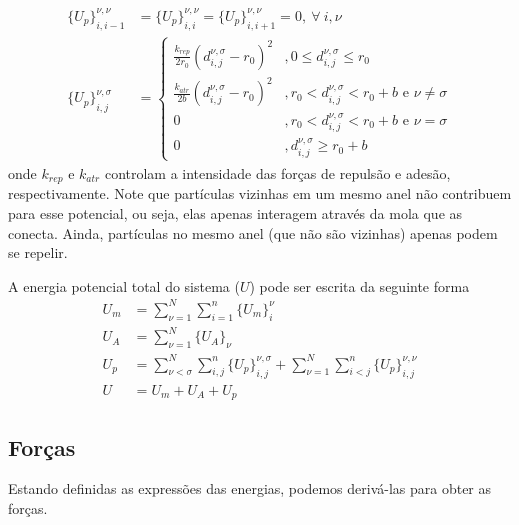 \documentclass{article}
\theoremstyle{definition}
\def \quantitygsc#1#2#3#4#5{{#1}_{#2, #3}^{#4, #5}}
\def \deslocgsc#1#2#3#4{\quantitygsc{d}{#1}{#2}{#3}{#4}}
\begin{document}
\begin{equation}
\begin{aligned}
{\{U_p\}}_{i, i-1}^{\nu, \nu} &= {\{U_p\}}_{i, i}^{\nu, \nu} = {\{U_p\}}_{i, i+1}^{\nu, \nu} = 0, ~\forall~i, \nu \\
{\{U_p\}}_{i, j}^{\nu, \sigma} &= \begin{cases}
    \frac{k_{rep}}{2r_0}(\deslocgsc{i}{j}{\nu}{\sigma} - r_0)^2 &, 0 \leq \deslocgsc{i}{j}{\nu}{\sigma} \leq r_0 \\
    \frac{k_{atr}}{2b}(\deslocgsc{i}{j}{\nu}{\sigma} - r_0)^2 &, r_0 < \deslocgsc{i}{j}{\nu}{\sigma} < r_0 + b \text{ e } \nu \neq \sigma \\
    0 &, r_0 < \deslocgsc{i}{j}{\nu}{\sigma} < r_0 + b \text{ e } \nu = \sigma \\
    0 &, \deslocgsc{i}{j}{\nu}{\sigma} \geq r_0 + b 
\end{cases}
\end{aligned}
\label{eq:particle_particle_pot}
\end{equation}
onde $k_{rep}$ e $k_{atr}$ controlam a intensidade das forças de repulsão e adesão, respectivamente. Note que partículas vizinhas em um mesmo anel não contribuem para esse potencial, ou seja, elas apenas interagem através da mola que as conecta. Ainda, partículas no mesmo anel (que não são vizinhas) apenas podem se repelir. 

A energia potencial total do sistema ($U$) pode ser escrita da seguinte forma
\begin{equation}
\begin{aligned}
    U_m &= \sum_{\nu=1}^N\sum_{i=1}^{n} {\{U_m\}}_i^\nu \\
    U_A &= \sum_{\nu=1}^N {\{U_A\}}_\nu \\
    U_p &= \sum_{\nu < \sigma}^N \sum_{i, j}^n {\{U_p\}}_{i, j}^{\nu,   \sigma}  + \sum_{\nu=1}^N\sum_{i < j}^n {\{U_p\}}_{i, j}^{\nu, \nu}\\
    U & = U_m + U_A + U_p
\end{aligned}
\label{eq:total_energy}
\end{equation}

\subsection{Forças}
Estando definidas as expressões das energias, podemos derivá-las para obter as forças.
\end{document}
